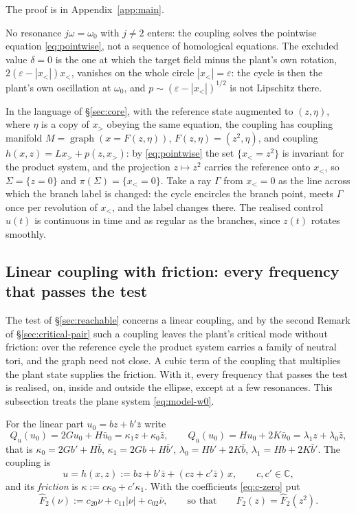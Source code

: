 \documentclass[11pt,reqno]{amsart}
\theoremstyle{plain}
\theoremstyle{definition}
\theoremstyle{remark}
\DeclareMathOperator{\graph}{graph}
\newcommand{\C}{\mathbb{C}}
\newcommand{\Sig}{\Sigma}
\begin{document}
The proof is in Appendix~\ref{app:main}.

No resonance $j\omega=\omega_0$ with $j\neq2$ enters: the coupling solves the pointwise equation
\eqref{eq:pointwise}, not a sequence of homological equations. The excluded value $\delta=0$ is the
one at which the target field minus the plant's own rotation, $2(\varepsilon-|x_<|)x_<$, vanishes on
the whole circle $|x_<|=\varepsilon$: the cycle is then the plant's own oscillation at $\omega_0$, and
$p\sim(\varepsilon-|x_<|)^{1/2}$ is not Lipschitz there.

In the language of \S\ref{sec:core}, with the reference state augmented to $(z,\eta)$, where $\eta$ is a copy of
$x_>$ obeying the same equation, the coupling has coupling manifold $M=\graph(x=F(z,\eta))$,
$F(z,\eta)=(z^{2},\eta)$, and coupling $h(x,z)=Lx_>+p(z,x_>)$: by \eqref{eq:pointwise} the set $\{x_<=z^{2}\}$ is
invariant for the product system, and the projection $z\mapsto z^{2}$ carries the reference onto
$x_<$, so $\Sig=\{z=0\}$ and $\pi(\Sig)=\{x_<=0\}$. Take a ray $\Gamma$ from $x_<=0$ as the line across which the branch label is changed: the cycle
encircles the branch point, meets $\Gamma$ once per revolution of $x_<$, and the label
changes there. The realised control $u(t)$ is continuous in time and as regular as the branches, since $z(t)$ rotates smoothly.

\subsection{Linear coupling with friction: every frequency that passes the test}\label{sec:friction}
The test of \S\ref{sec:reachable} concerns a linear coupling, and by the second Remark of
\S\ref{sec:critical-pair} such a coupling leaves the plant's critical mode without friction: over
the reference cycle the product system carries a family of neutral tori, and the graph need not close.
A cubic term of the coupling that multiplies the plant state supplies the friction. With it, every
frequency that passes the test is realised, on, inside and outside the ellipse, except at a few resonances. This subsection treats
the plane system \eqref{eq:model-w0}.

For the linear part $u_0=bz+b'\bar z$ write
\[
  Q_u(u_0)=2Gu_0+H\bar u_0=\kappa_1z+\kappa_0\bar z,\qquad Q_{\bar u}(u_0)=Hu_0+2K\bar u_0=\lambda_1z+\lambda_0\bar z,
\]
that is $\kappa_0=2Gb'+H\bar b$, $\kappa_1=2Gb+H\bar b'$, $\lambda_0=Hb'+2K\bar b$, $\lambda_1=Hb+2K\bar b'$. The coupling is
\begin{equation}\label{eq:fric-coupling}
  u=h(x,z):=bz+b'\bar z+(cz+c'\bar z)\,x,\qquad c,c'\in\C,
\end{equation}
and its \emph{friction} is $\kappa:=c\kappa_0+c'\kappa_1$. With the coefficients \eqref{eq:c-zero} put
\[
  \hat F_2(\nu):=c_{20}\nu+c_{11}|\nu|+c_{02}\bar\nu ,\qquad\text{so that}\qquad F_2(z)=\hat F_2(z^{2}).
\]
\end{document}
